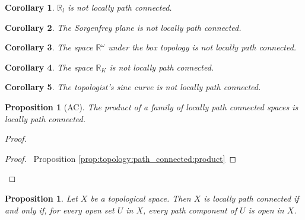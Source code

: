 \documentclass{report}
\let\qed\relax
\newtheorem{prop}[lm]{Proposition}
\newtheorem{cor}{Corollary}[lm]
\theoremstyle{definition}
\begin{document}
 \begin{cor}
   $\mathbb{R}_l$ is not locally path connected.
 \end{cor}

 \begin{cor}
  The Sorgenfrey plane is not locally path connected.
 \end{cor}

 \begin{cor}
   The space $\mathbb{R}^\omega$ under the box topology is not locally path
connected.
 \end{cor}

 \begin{cor}
   The space $\mathbb{R}_K$ is not locally path connected.
 \end{cor}

\begin{cor}
The topologist's sine curve is not locally path connected.
\end{cor}

\begin{prop}[AC]
  The product of a family of locally path connected spaces is locally path connected.
\end{prop}

\begin{proof}
  \pf
  \begin{proof}
    \pf\ Proposition \ref{prop:topology:path_connected:product}
  \end{proof}
  \qed
\end{proof}

  \begin{prop}
    \label{prop:topology:locally_path_connected:open}
    Let $X$ be a topological space. Then $X$ is locally path connected if and
    only
    if, for every open set $U$ in $X$, every path component of $U$ is open in
    $X$.
  \end{prop}
\end{document}
